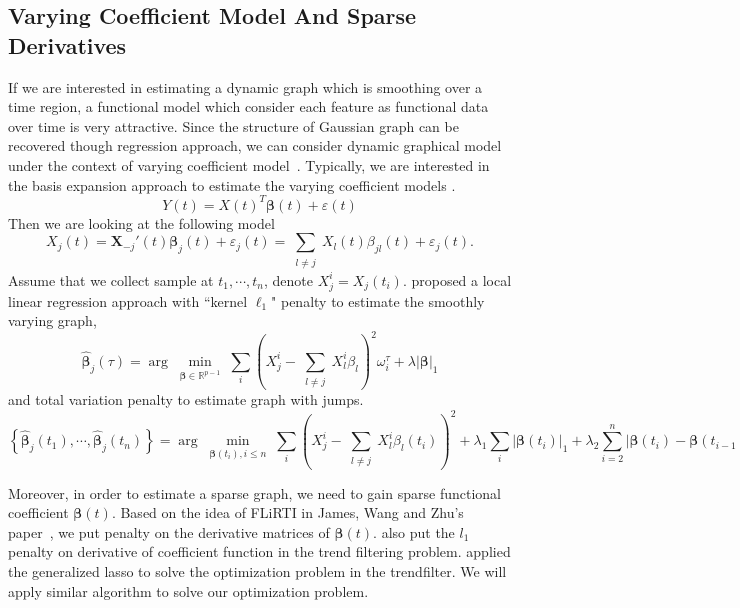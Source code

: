 \documentclass[11pt]{article}
\newcommand{\R}{\mathbb R}
\newcommand{\bX}{\mathbf X}
\newcommand{\bbeta}{{\boldsymbol{\beta}}}
\begin{document}
\subsection{Varying Coefficient Model And Sparse Derivatives}
If we are interested in estimating a dynamic graph which is smoothing over a time region, a functional model which consider each feature as functional data over time is very attractive. Since the structure of Gaussian graph can be recovered though regression approach, we can consider dynamic graphical model under the context of varying coefficient model~\citep{hastie1993varying, fan2008statistical}. Typically, we are interested in the basis expansion approach to estimate the varying coefficient models \citep{huang2002varying, huang2004polynomial}. 
$$ Y(t) = X(t)^T \bbeta(t) + \varepsilon(t) $$
Then we are looking at the following model
\begin{equation}
	\label{eq:varycoefmodel}
	X_j(t) = \bX_{-j}'(t) \bbeta_j(t) + \varepsilon_j(t) = \sum_{\substack{l\neq j}} X_l(t) \beta_{jl}(t) + \varepsilon_j(t).
\end{equation}
Assume that we collect sample at $t_1, \cdots, t_n$, denote $X_j^i = X_j(t_i)$. \cite{kolar2009sparsistent, kolar2010estimating, kolar2011time, kolar2012estimating} proposed a local linear regression approach with ``kernel $\ell_1$" penalty  to estimate the smoothly varying graph,
\begin{equation}
	\label{eq:smoothgraph}
	\hat{\bbeta}_j(\tau) = \arg\min_{\substack{\bbeta \in \R^{p-1}}} \sum_i(X_j^i - \sum_{\substack{l\neq j}} X_l^i \beta_l)^2 \omega_i^{\tau} + \lambda|\bbeta|_1
\end{equation}
and total variation penalty to estimate graph with jumps. 
\begin{equation}
	\label{eq::jumpgraph}
	\left\{ \hat{\bbeta}_j(t_1), \cdots, \hat{\bbeta}_j(t_n) \right\} = \arg\min_{\substack{\bbeta(t_i), i \leq n}} \sum_i(X_j^i - \sum_{\substack{l\neq j}} X_l^i \beta_l(t_i))^2  + \lambda_1 \sum_{i}|\bbeta(t_i)|_1 + \lambda_2 \sum_{i = 2}^n|\bbeta(t_i) - \bbeta(t_{i-1})|_1
\end{equation}


Moreover, in order to estimate a sparse graph, we need to gain sparse functional coefficient $\bbeta(t)$. Based on the idea of FLiRTI in James, Wang and Zhu's paper~\cite{james2009functional}, we put penalty on the derivative matrices of $\bbeta(t)$. \cite{kim2009ell_1} also put the $l_1$ penalty on derivative of coefficient function in the trend filtering problem. \cite{tibshirani2014adaptive} applied the generalized lasso \citep{tibshirani2011solution} to solve the optimization problem in the trendfilter. We will apply similar algorithm to solve our optimization problem. 
\end{document}
